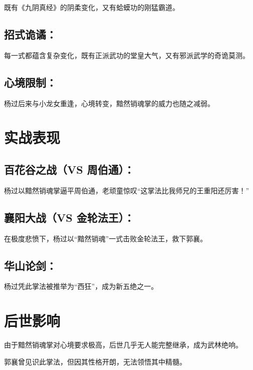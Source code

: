 \documentclass[doctor, vlined, ]{DissertUESTC}
\begin{document}
	既有《九阴真经》的阴柔变化，又有蛤蟆功的刚猛霸道。

	\subsection{招式诡谲：}

	每一式都蕴含复杂变化，既有正派武功的堂皇大气，又有邪派武学的奇诡莫测。

	\subsection{心境限制：}

	杨过后来与小龙女重逢，心境转变，黯然销魂掌的威力也随之减弱。

	\section{实战表现}

	\subsection{百花谷之战（VS 周伯通）：}

	杨过以黯然销魂掌逼平周伯通，老顽童惊叹“这掌法比我师兄的王重阳还厉害！”

	\subsection{襄阳大战（VS 金轮法王）：}

	在极度悲愤下，杨过以“黯然销魂”一式击败金轮法王，救下郭襄。

	\subsection{华山论剑：}

	杨过凭此掌法被推举为“西狂”，成为新五绝之一。

	\section{后世影响}

	由于黯然销魂掌对心境要求极高，后世几乎无人能完整继承，成为武林绝响。

	郭襄曾见识此掌法，但因其性格开朗，无法领悟其中精髓。
	
	
	\achievement %
	
\end{document}
